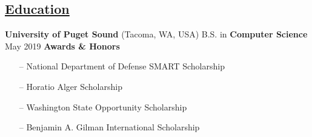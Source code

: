 \documentclass{article}
\begin{document}
\begin{multicols}{2}
\section*{\underline{Education}}
{\footnotesize{
\textbf{University of Puget Sound} (Tacoma, WA, USA)
\newline B.S. in \textbf{Computer Science}
\newline May 2019
\newline\newline\textbf{Awards \& Honors}
\begin{itemize}
	\item[--] National Department of Defense SMART Scholarship
	\item[--] Horatio Alger Scholarship
	\item[--] Washington State Opportunity Scholarship
	\item[--] Benjamin A. Gilman International Scholarship   
\end{itemize} 
}}

\hfill  \quad

\end{multicols} 
\end{document}

